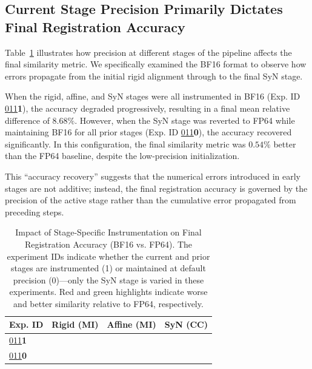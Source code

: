\documentclass[journal,twoside,web]{ieeecolor}
\begin{document}
\subsection{Current Stage Precision Primarily Dictates Final Registration Accuracy}
Table~\ref{tab:stage-accuracy} illustrates how precision at different stages of the pipeline affects the final similarity metric. We specifically examined the BF16 format to observe how errors propagate from the initial rigid alignment through to the final SyN stage.

When the rigid, affine, and SyN stages were all instrumented in BF16 (Exp. ID \uline{011}\textbf{1}), the accuracy degraded progressively, resulting in a final mean relative difference of $8.68\%$. However, when the SyN stage was reverted to FP64 while maintaining BF16 for all prior stages (Exp. ID \uline{011}\textbf{0}), the accuracy recovered significantly. In this configuration, the final similarity metric was $0.54\%$ better than the FP64 baseline, despite the low-precision initialization.

This ``accuracy recovery'' suggests that the numerical errors introduced in early stages are not additive; instead, the final registration accuracy is governed by the precision of the active stage rather than the cumulative error propagated from preceding steps.

\begin{table}[htb!]
	\centering
	\begin{tabular}{@{}llll@{}}
		\toprule
		\multicolumn{1}{c}{\textbf{Exp. ID}} & \multicolumn{1}{c}{\textbf{Rigid (MI)}} & \multicolumn{1}{c}{\textbf{Affine (MI)}} & \multicolumn{1}{c}{\textbf{SyN (CC)}} \\ \midrule
		{\uline{011}\textbf{1}}              & \cellcolor{RedHL}{2.34e-02}             & \cellcolor{RedHL}{1.86e-01}              & \cellcolor{RedHL}{8.68e-02}           \\
		{\uline{011}\textbf{0}}              & \cellcolor{RedHL}{2.34e-02}             & \cellcolor{RedHL}{1.86e-01}              & \cellcolor{GreenHL}{-5.38e-03}        \\ \bottomrule
	\end{tabular}
	\caption{Impact of Stage-Specific Instrumentation on Final Registration Accuracy (BF16 vs. FP64). The experiment IDs indicate whether the current and prior stages are instrumented (1) or maintained at default precision (0)---only the SyN stage is varied in these experiments. Red and green highlights indicate worse and better similarity relative to FP64, respectively.}
	\label{tab:stage-accuracy}
\end{table}
\end{document}
